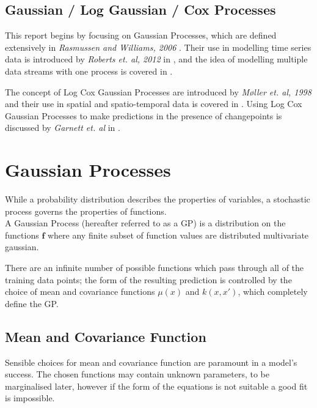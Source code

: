 \documentclass[a4paper,11pt]{report}
\begin{document}
\section{Gaussian / Log Gaussian / Cox Processes}
This report begins by focusing on Gaussian Processes, which are defined extensively in \textit{Rasmussen and Williams, 2006} \cite{GP4ML}. Their use in modelling time series data is introduced by \textit{Roberts et. al, 2012} in \cite{GP-robots}, and the idea of modelling multiple data streams with one process is covered in \cite{multi-outputGP}.

The concept of Log Cox Gaussian Processes are introduced by \textit{M\o ller et. al, 1998} \cite{LGCP-moller} and their use in spatial and spatio-temporal data is covered in \cite{LGCP-diggle}. Using Log Cox Gaussian Processes to make predictions in the presence of changepoints is discussed by \textit{Garnett et. al} in \cite{changepoint-prediction}.

\chapter{Gaussian Processes}

While a probability distribution describes the properties of variables, a stochastic process governs the properties of functions. \\

A Gaussian Process (hereafter referred to as a GP) is a distribution on the functions \(\mathbf{f}\) where any finite subset of function values are distributed multivariate gaussian. 


There are an infinite number of possible functions which pass through all of the training data points; the form of the resulting prediction is controlled by the choice of mean and covariance functions \(\mu (x)\) and \( k(x,x')\), which completely define the GP.

\section{Mean and Covariance Function}

Sensible choices for mean and covariance function are paramount in a model's success. The chosen functions may contain unknown parameters, to be marginalised later, however if the form of the equations is not suitable a good fit is impossible. \\ \par
\end{document}
